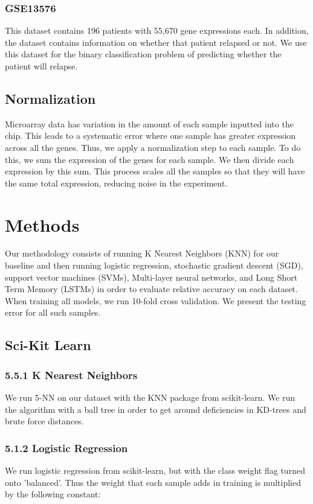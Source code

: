 \documentclass[12pt]{scrartcl}
\begin{document}
    \subsubsection{GSE13576}
    This dataset contains 196 patients with 55,670 gene expressions each. In addition, the dataset contains information on whether that patient relapsed or not. We use this dataset for the binary classification problem of predicting whether the patient will relapse. 

    \subsection{Normalization}
Microarray data has variation in the amount of each sample inputted into the chip. This leads to a systematic error where one sample has greater expression across all the genes. Thus, we apply a normalization step to each sample. To do this, we sum the expression of the genes for each sample. We then divide each expression by this sum. This process scales all the samples so that they will have the same total expression, reducing  noise in the experiment.
    \section{Methods}
    Our methodology consists of running K Nearest Neighbors (KNN) for our baseline and then running logistic regression, stochastic gradient descent (SGD), support vector machines (SVMs), Multi-layer neural networks, and Long Short Term Memory (LSTMs) in order to evaluate relative accuracy on each dataset. \\
    
    When training all models, we run 10-fold cross validation. We present the testing error for all such samples. 

    \subsection{Sci-Kit Learn}
    \subsubsection*{5.5.1 K Nearest Neighbors}
    We run 5-NN on our dataset with the KNN package from scikit-learn. We run the algorithm with a ball tree in order to get around deficiencies in KD-trees and brute force distances. 
    
    \subsubsection*{5.1.2 Logistic Regression}
    We run logistic regression from scikit-learn, but with the class weight flag turned onto 'balanced'. Thus the weight that each sample adds in training is multiplied by the following constant:
    
\end{document}

